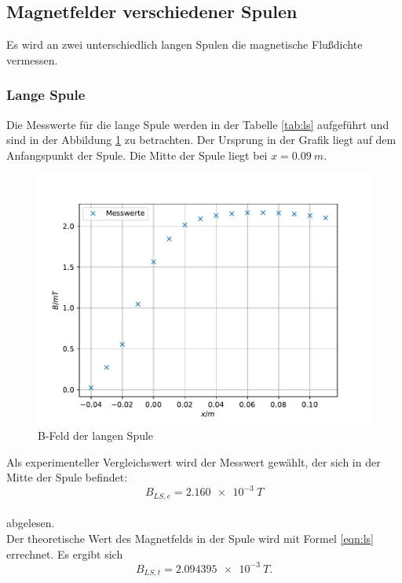 \subsection{Magnetfelder verschiedener Spulen}
Es wird an zwei unterschiedlich langen Spulen die magnetische Flußdichte vermessen.

\subsubsection{Lange Spule}
Die Messwerte für die lange Spule werden in der Tabelle \ref{tab:ls} aufgeführt und sind in der Abbildung \ref{fig:ls} zu betrachten.
Der Ursprung in der Grafik liegt auf dem Anfangspunkt der Spule.
Die Mitte der Spule liegt bei $x=\SI{0.09}{m}$.

\begin{figure}[h!]
  \centering
  \includegraphics[width=\textwidth]{Langesp.pdf}
  \caption{B-Feld der langen Spule}
  \label{fig:ls}
\end{figure}
Als experimenteller Vergleichswert wird der Messwert gewählt, der sich in der Mitte der Spule befindet:
\begin{equation*}
  B_{LS, e} = \SI{2.160e-3}{T}
\end{equation*}
\\abgelesen.
\\Der theoretische Wert des Magnetfelds in der Spule wird mit Formel \eqref{eqn:ls} errechnet.
Es ergibt sich
\begin{equation*}
  B_{LS, t} = \SI{2.094395e-3}{T}.
\end{equation*}
\FloatBarrier

